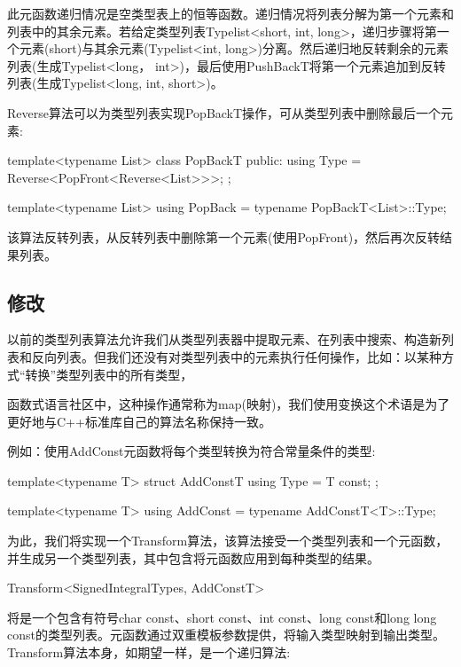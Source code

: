 此元函数递归情况是空类型表上的恒等函数。递归情况将列表分解为第一个元素和列表中的其余元素。若给定类型列表Typelist<short, int, long>，递归步骤将第一个元素(short)与其余元素(Typelist<int, long>)分离。然后递归地反转剩余的元素列表(生成Typelist<long， int>)，最后使用PushBackT将第一个元素追加到反转列表(生成Typelist<long, int, short>)。

Reverse算法可以为类型列表实现PopBackT操作，可从类型列表中删除最后一个元素:

\begin{cpp}
template<typename List>
class PopBackT {
	public:
	using Type = Reverse<PopFront<Reverse<List>>>;
};

template<typename List>
using PopBack = typename PopBackT<List>::Type;
\end{cpp}

该算法反转列表，从反转列表中删除第一个元素(使用PopFront)，然后再次反转结果列表。

\subsection{修改}

以前的类型列表算法允许我们从类型列表器中提取元素、在列表中搜索、构造新列表和反向列表。但我们还没有对类型列表中的元素执行任何操作，比如：以某种方式“转换”类型列表中的所有类型，

\begin{notice}函数式语言社区中，这种操作通常称为map(映射)，我们使用变换这个术语是为了更好地与C++标准库自己的算法名称保持一致。
\end{notice}

例如：使用AddConst元函数将每个类型转换为符合常量条件的类型:

\begin{cpp}
template<typename T>
struct AddConstT
{
	using Type = T const;
};

template<typename T>
using AddConst = typename AddConstT<T>::Type;
\end{cpp}

为此，我们将实现一个Transform算法，该算法接受一个类型列表和一个元函数，并生成另一个类型列表，其中包含将元函数应用到每种类型的结果。

\begin{cpp}
Transform<SignedIntegralTypes, AddConstT>
\end{cpp}

将是一个包含有符号char const、short const、int const、long const和long long const的类型列表。元函数通过双重模板参数提供，将输入类型映射到输出类型。Transform算法本身，如期望一样，是一个递归算法:

